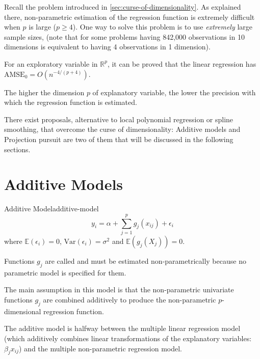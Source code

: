 Recall the problem introduced in \cref{sec:curse-of-dimensionality}. As explained
there, non-parametric estimation of the regression function is extremely difficult
when $p$ is large ($p \geq 4$). One way to solve this problem
is to use \emph{extremely} large sample sizes, (note that
for some problems having 842,000 observations in 10 dimensions is
equivalent to having 4 observations in 1 dimension).

For an exploratory variable in $\mathds R^p$, it can be proved that
the linear regression has $\text{AMSE}_0 = O(n^{-4/(p+4)})$.

The higher the dimension $p$ of explanatory variable, the lower the precision with which
the regression function is estimated.

There exist proposals, alternative to local polynomial regression or spline smoothing,
that overcome the curse of dimensionality:
Additive models and Projection pursuit are two of them that will be discussed in the
following sections.

\pagebreak
\section{Additive Models}

\begin{definition}{Additive Model}{additive-model}
    \begin{equation*}
        y_i = \alpha + \sum_{j=1}^p g_j(x_{ij}) + \epsilon_i
    \end{equation*}
    where $\mathds E(\epsilon_i) = 0$, $\text{Var}(\epsilon_i) = \sigma^2$ and
    $\mathds E(g_j(X_{j})) = 0$.

    Functions $g_j$ are called  and must be estimated
    non-parametrically because no parametric model is specified for them.

    \tcblower

    The main assumption in this model is that the non-parametric univariate functions
    $g_j$ are combined additively to produce the non-parametric $p$-dimensional
    regression function.

    \begin{note}
        The additive model is halfway between the multiple linear regression model
        (which additively combines linear transformations of the explanatory variables: $\beta_jx_{ij}$)
        and the multiple non-parametric regression model.
    \end{note}
\end{definition}

